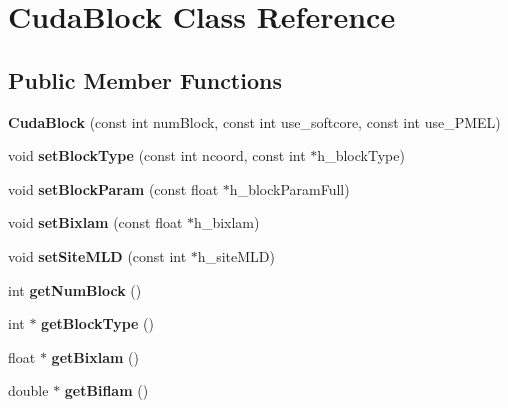 \hypertarget{classCudaBlock}{}\section{Cuda\+Block Class Reference}
\label{classCudaBlock}
\subsection*{Public Member Functions}
\begin{DoxyCompactItemize}
\item 
\hypertarget{classCudaBlock_a6131c6f8ed1abc5ba8fa4a2a2ca055d9}{}\label{classCudaBlock_a6131c6f8ed1abc5ba8fa4a2a2ca055d9} 
{\bfseries Cuda\+Block} (const int num\+Block, const int use\+\_\+softcore, const int use\+\_\+\+P\+M\+EL)
\item 
\hypertarget{classCudaBlock_a4781318d60ffec96616e3a4894b864a3}{}\label{classCudaBlock_a4781318d60ffec96616e3a4894b864a3} 
void {\bfseries set\+Block\+Type} (const int ncoord, const int $\ast$h\+\_\+block\+Type)
\item 
\hypertarget{classCudaBlock_aa83f8fc5096a4381314ac92183fbf636}{}\label{classCudaBlock_aa83f8fc5096a4381314ac92183fbf636} 
void {\bfseries set\+Block\+Param} (const float $\ast$h\+\_\+block\+Param\+Full)
\item 
\hypertarget{classCudaBlock_a0728de486ea9b102dca1bf822b1b2a6e}{}\label{classCudaBlock_a0728de486ea9b102dca1bf822b1b2a6e} 
void {\bfseries set\+Bixlam} (const float $\ast$h\+\_\+bixlam)
\item 
\hypertarget{classCudaBlock_a521b88d865583a6e5003dbcb8b9b66eb}{}\label{classCudaBlock_a521b88d865583a6e5003dbcb8b9b66eb} 
void {\bfseries set\+Site\+M\+LD} (const int $\ast$h\+\_\+site\+M\+LD)
\item 
\hypertarget{classCudaBlock_aff0a25b9d34200b1ddc0778cd09b9c93}{}\label{classCudaBlock_aff0a25b9d34200b1ddc0778cd09b9c93} 
int {\bfseries get\+Num\+Block} ()
\item 
\hypertarget{classCudaBlock_a393323b25d6ef181fbe368771b500c4a}{}\label{classCudaBlock_a393323b25d6ef181fbe368771b500c4a} 
int $\ast$ {\bfseries get\+Block\+Type} ()
\item 
\hypertarget{classCudaBlock_a63dbe00f85a571673f60184a37f6ce9e}{}\label{classCudaBlock_a63dbe00f85a571673f60184a37f6ce9e} 
float $\ast$ {\bfseries get\+Bixlam} ()
\item 
\hypertarget{classCudaBlock_a7ffeffc6327ad8423c575be514b884ae}{}\label{classCudaBlock_a7ffeffc6327ad8423c575be514b884ae} 
double $\ast$ {\bfseries get\+Biflam} ()

\end{DoxyCompactItemize}
